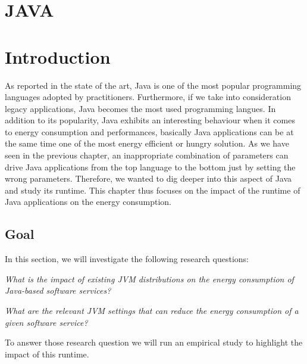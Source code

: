 \section*{JAVA}
\section{Introduction}
As reported in the state of the art, Java is one of the most popular programming languages adopted by practitioners.%
Furthermore, if we take into consideration legacy applications, Java becomes the most used programming langues.%
In addition to its popularity, Java exhibits an interesting behaviour when it comes to energy consumption and performances, basically Java applications can be at the same time one of the most energy efficient or hungry solution.
As we have seen in the previous chapter, an inappropriate combination of parameters can drive Java applications from the top language to the bottom just by setting the wrong parameters.
Therefore, we wanted to dig deeper into this aspect of Java and study its runtime.
This chapter thus focuses on the impact of the runtime of Java applications on the energy consumption.

\subsection{Goal}
In this section, we will investigate the following research questions:
\begin{compactenum}[\indent\bf RQ\,1:]
    \item \emph{What is the impact of existing JVM distributions on the energy consumption of Java-based software services?}
    \item \emph{What are the relevant JVM settings that can reduce the energy consumption of a given software service?}
\end{compactenum}

To answer those research question we will run an empirical study to highlight the impact of this runtime.

